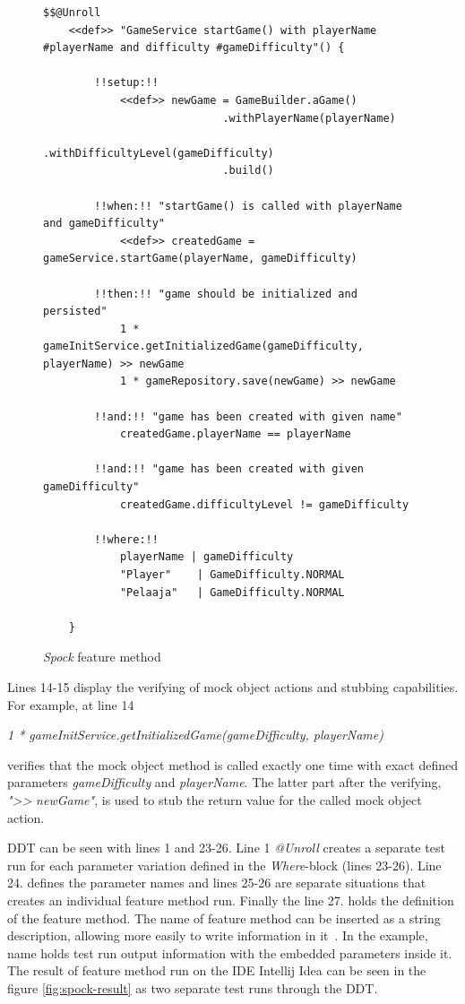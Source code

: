    \clearpage
    \begin{figure}[H]
        \begin{lstlisting}[style=java]
    $$@Unroll
    <<def>> "GameService startGame() with playerName #playerName and difficulty #gameDifficulty"() {

        !!setup:!!
            <<def>> newGame = GameBuilder.aGame()
                            .withPlayerName(playerName)
                            .withDifficultyLevel(gameDifficulty)
                            .build()

        !!when:!! "startGame() is called with playerName and gameDifficulty"
            <<def>> createdGame = gameService.startGame(playerName, gameDifficulty)

        !!then:!! "game should be initialized and persisted"
            1 * gameInitService.getInitializedGame(gameDifficulty, playerName) >> newGame
            1 * gameRepository.save(newGame) >> newGame

        !!and:!! "game has been created with given name"
            createdGame.playerName == playerName

        !!and:!! "game has been created with given gameDifficulty"
            createdGame.difficultyLevel != gameDifficulty

        !!where:!!
            playerName | gameDifficulty
            "Player"    | GameDifficulty.NORMAL
            "Pelaaja"   | GameDifficulty.NORMAL

    }
          \end{lstlisting}
        \caption{\textit{Spock} feature method}
        \label{fig:spock-example}

    \end{figure}
    Lines 14-15 display the verifying of mock object actions and stubbing capabilities.
    For example, at line 14
    \begin{center}
    \textit{1 * gameInitService.getInitializedGame(gameDifficulty, playerName)}
    \end{center}
    verifies that the mock object method is called exactly one time with exact defined parameters \textit{gameDifficulty} and \textit{playerName}.
    The latter part after the verifying, \textit{"\textgreater\textgreater} \textit{newGame"}, is used to stub the return value for the
    called mock object action.

    DDT can be seen with lines 1 and 23-26.
    Line 1 \textit{@Unroll} creates a separate test run for each parameter
    variation defined in the \textit{Where}-block (lines 23-26). Line 24. defines the parameter names and lines 25-26 are
    separate situations that creates an individual feature method run. Finally the line 27. holds the definition of
    the feature method. The name of feature method can be inserted as a string description, allowing more easily to write
    information in it~\cite{kapelonis2016java}. In the example, name holds test run output information with the embedded parameters inside it.
    The result of feature method run on the IDE Intellij Idea can be seen in the figure \ref{fig:spock-result} as two separate test runs through the DDT.

